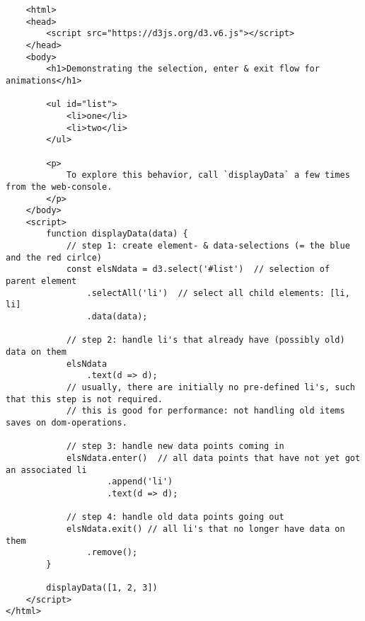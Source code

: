\begin{lstlisting}
    <html>
    <head>
        <script src="https://d3js.org/d3.v6.js"></script>
    </head>
    <body>
        <h1>Demonstrating the selection, enter & exit flow for animations</h1>

        <ul id="list">
            <li>one</li>
            <li>two</li>
        </ul>

        <p>
            To explore this behavior, call `displayData` a few times from the web-console.
        </p>
    </body>
    <script>
        function displayData(data) {
            // step 1: create element- & data-selections (= the blue and the red cirlce)
            const elsNdata = d3.select('#list')  // selection of parent element
                .selectAll('li')  // select all child elements: [li, li]
                .data(data);

            // step 2: handle li's that already have (possibly old) data on them
            elsNdata
                .text(d => d);
            // usually, there are initially no pre-defined li's, such that this step is not required.
            // this is good for performance: not handling old items saves on dom-operations.
    
            // step 3: handle new data points coming in
            elsNdata.enter()  // all data points that have not yet got an associated li
                    .append('li')
                    .text(d => d);
            
            // step 4: handle old data points going out
            elsNdata.exit() // all li's that no longer have data on them
                .remove();
        }

        displayData([1, 2, 3])
    </script>
</html>
\end{lstlisting}


